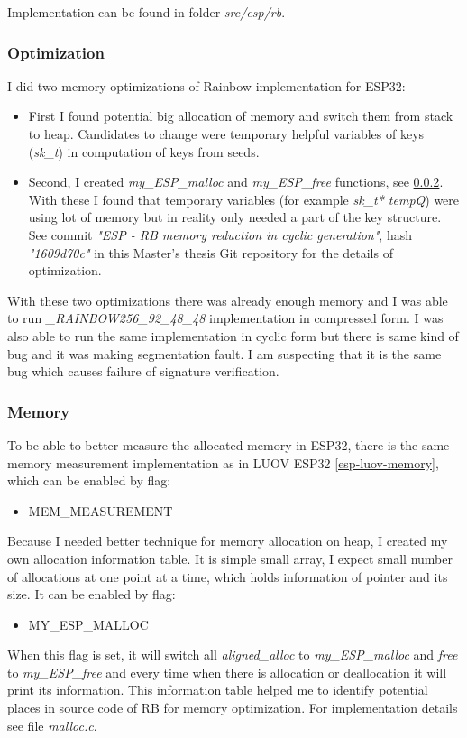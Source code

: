 \documentclass[thesis=M,english]{FITthesis}[2019/12/23]
\begin{document}
\bigskip
\noindent
Implementation can be found in folder \textit{src/esp/rb}. 

\subsubsection{Optimization} \label{rb-opti}
I did two memory optimizations of Rainbow implementation for ESP32:
\begin{itemize}
\item	First I found potential big allocation of memory and switch them from stack to heap. Candidates to change were temporary helpful variables of keys (\textit{sk\_t}) in computation of keys from seeds.

\item	Second, I created \textit{my\_ESP\_malloc} and \textit{my\_ESP\_free} functions, see \ref{esp-rb-memory}. With these I found that temporary variables (for example \textit{sk\_t* tempQ}) were using lot of memory but in reality only needed a part of the key structure. See commit \textit{"ESP - RB memory reduction in cyclic generation"}, hash \textit{"1609d70c"} in this Master's thesis Git repository for the details of optimization.
\end{itemize}

With these two optimizations there was already enough memory and I was able to run \textit{\_RAINBOW256\_92\_48\_48} implementation in compressed form. I was also able to run the same implementation in cyclic form but there is same kind of bug and it was making segmentation fault. I am suspecting that it is the same bug 
which causes failure of signature verification.

\subsubsection{Memory} \label{esp-rb-memory}
To be able to better measure the allocated memory in ESP32, there is the same memory measurement implementation as in LUOV ESP32 \ref{esp-luov-memory}, which can be enabled by flag:
\begin{itemize}
\item	MEM\_MEASUREMENT
\end{itemize}

Because I needed better technique for memory allocation on heap, I created my own allocation information table. It is simple small array, I expect small number of allocations at one point at a time, which holds information of pointer and its size.
It can be enabled by flag:
\begin{itemize}
\item	MY\_ESP\_MALLOC
\end{itemize}
When this flag is set, it will switch all \textit{aligned\_alloc} to \textit{my\_ESP\_malloc} and \textit{free} to \textit{my\_ESP\_free} and every time when there is allocation or deallocation it will print its information.
This information table helped me to identify potential places in source code of RB for memory optimization. For implementation details see file \textit{malloc.c}.
\end{document}
